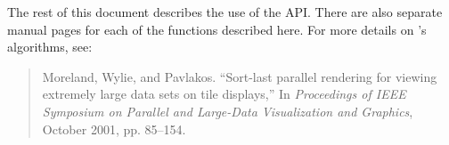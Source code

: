 The rest of this document describes the use of the
\IceT
API.  There are also separate manual pages for each of the functions
described here.  For more details on
\IceT's
algorithms, see:

\begin{quote}
  Moreland, Wylie, and Pavlakos.  ``Sort-last parallel rendering for
  viewing extremely large data sets on tile displays,'' In
  \emph{Proceedings of IEEE Symposium on Parallel and Large-Data
    Visualization and Graphics}, October 2001, pp. 85--154.
\end{quote}
